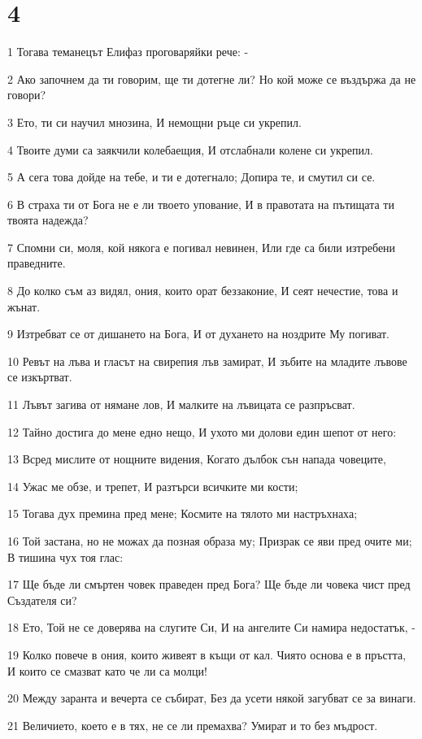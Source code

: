 \chapter{4}

\par 1 Тогава теманецът Елифаз проговаряйки рече: -
\par 2 Ако започнем да ти говорим, ще ти дотегне ли? Но кой може се въздържа да не говори?
\par 3 Ето, ти си научил мнозина, И немощни ръце си укрепил.
\par 4 Твоите думи са заякчили колебаещия, И отслабнали колене си укрепил.
\par 5 А сега това дойде на тебе, и ти е дотегнало; Допира те, и смутил си се.
\par 6 В страха ти от Бога не е ли твоето упование, И в правотата на пътищата ти твоята надежда?
\par 7 Спомни си, моля, кой някога е погивал невинен, Или где са били изтребени праведните.
\par 8 До колко съм аз видял, ония, които орат беззаконие, И сеят нечестие, това и жънат.
\par 9 Изтребват се от дишането на Бога, И от духането на ноздрите Му погиват.
\par 10 Ревът на лъва и гласът на свирепия лъв замират, И зъбите на младите лъвове се изкъртват.
\par 11 Лъвът загива от нямане лов, И малките на лъвицата се разпръсват.
\par 12 Тайно достига до мене едно нещо, И ухото ми долови един шепот от него:
\par 13 Всред мислите от нощните видения, Когато дълбок сън напада човеците,
\par 14 Ужас ме обзе, и трепет, И разтърси всичките ми кости;
\par 15 Тогава дух премина пред мене; Космите на тялото ми настръхнаха;
\par 16 Той застана, но не можах да позная образа му; Призрак се яви пред очите ми; В тишина чух тоя глас:
\par 17 Ще бъде ли смъртен човек праведен пред Бога? Ще бъде ли човека чист пред Създателя си?
\par 18 Ето, Той не се доверява на слугите Си, И на ангелите Си намира недостатък, -
\par 19 Колко повече в ония, които живеят в къщи от кал. Чиято основа е в пръстта, И които се смазват като че ли са молци!
\par 20 Между заранта и вечерта се събират, Без да усети някой загубват се за винаги.
\par 21 Величието, което е в тях, не се ли премахва? Умират и то без мъдрост.


